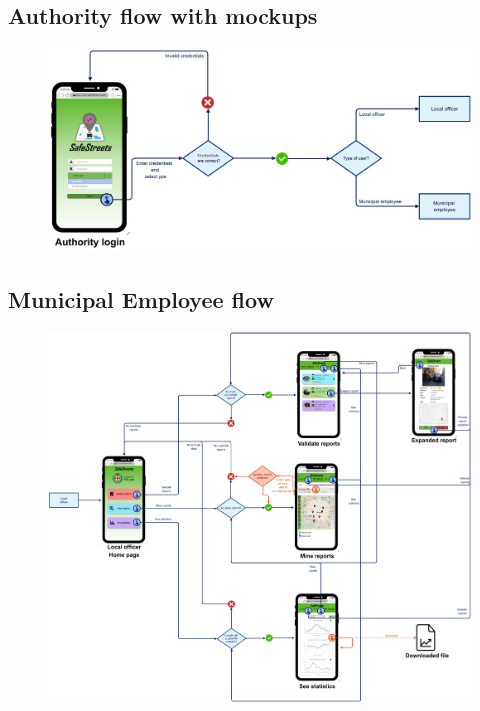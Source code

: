 			\subsection{Authority flow with mockups}
			\begin{figure}[!h]
				\centering
				\includegraphics[width=\textwidth]{images/Flow/AuthorityFlow}
			\end{figure}
			\subsection{Municipal Employee flow}
			\begin{figure}[!h]
				\centering
				\includegraphics[width=\textwidth]{images/Flow/MEFlow}
			\end{figure}
